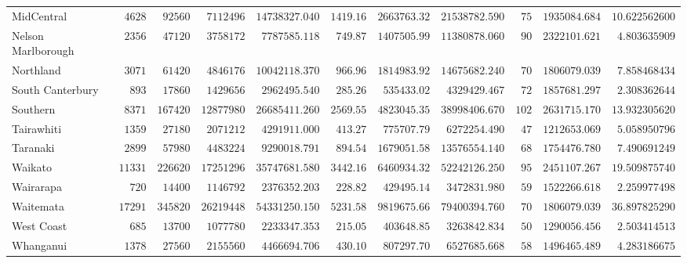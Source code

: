 \documentclass{article}
\begin{document}
\begin{table}
\begin{center}
\begin{tabular}{lrrrrrrrrrr}
MidCentral&$ 4628$&$ 92560$&$ 7112496$&$14738327.040$&$1419.16$&$ 2663763.32$&$21538782.590$&$ 75$&$1935084.684$&$10.622562600$\tabularnewline
Nelson Marlborough&$ 2356$&$ 47120$&$ 3758172$&$ 7787585.118$&$ 749.87$&$ 1407505.99$&$11380878.060$&$ 90$&$2322101.621$&$ 4.803635909$\tabularnewline
Northland&$ 3071$&$ 61420$&$ 4846176$&$10042118.370$&$ 966.96$&$ 1814983.92$&$14675682.240$&$ 70$&$1806079.039$&$ 7.858468434$\tabularnewline
South Canterbury&$  893$&$ 17860$&$ 1429656$&$ 2962495.540$&$ 285.26$&$  535433.02$&$ 4329429.467$&$ 72$&$1857681.297$&$ 2.308362644$\tabularnewline
Southern&$ 8371$&$167420$&$12877980$&$26685411.260$&$2569.55$&$ 4823045.35$&$38998406.670$&$102$&$2631715.170$&$13.932305620$\tabularnewline
Tairawhiti&$ 1359$&$ 27180$&$ 2071212$&$ 4291911.000$&$ 413.27$&$  775707.79$&$ 6272254.490$&$ 47$&$1212653.069$&$ 5.058950796$\tabularnewline
Taranaki&$ 2899$&$ 57980$&$ 4483224$&$ 9290018.791$&$ 894.54$&$ 1679051.58$&$13576554.140$&$ 68$&$1754476.780$&$ 7.490691249$\tabularnewline
Waikato&$11331$&$226620$&$17251296$&$35747681.580$&$3442.16$&$ 6460934.32$&$52242126.250$&$ 95$&$2451107.267$&$19.509875740$\tabularnewline
Wairarapa&$  720$&$ 14400$&$ 1146792$&$ 2376352.203$&$ 228.82$&$  429495.14$&$ 3472831.980$&$ 59$&$1522266.618$&$ 2.259977498$\tabularnewline
Waitemata&$17291$&$345820$&$26219448$&$54331250.150$&$5231.58$&$ 9819675.66$&$79400394.760$&$ 70$&$1806079.039$&$36.897825290$\tabularnewline
West Coast&$  685$&$ 13700$&$ 1077780$&$ 2233347.353$&$ 215.05$&$  403648.85$&$ 3263842.834$&$ 50$&$1290056.456$&$ 2.503414513$\tabularnewline
Whanganui&$ 1378$&$ 27560$&$ 2155560$&$ 4466694.706$&$ 430.10$&$  807297.70$&$ 6527685.668$&$ 58$&$1496465.489$&$ 4.283186675$\tabularnewline
\hline
\end{tabular}\end{center}\end{table}
\end{document}
